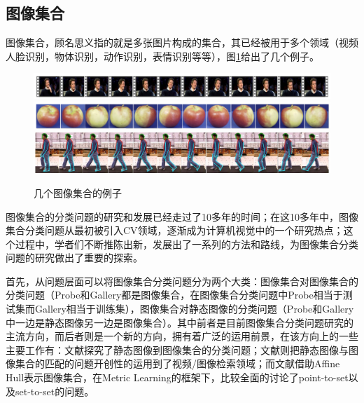 \subsection{图像集合}
\label{sec:Image-Set}
图像集合，顾名思义指的就是多张图片构成的集合，其已经被用于多个领域（视频人脸识别，物体识别，动作识别，表情识别等等），图\ref{fig:image_set_exmples}给出了几个例子。
\begin{figure}[h]
      	{\includegraphics[width=\linewidth]{source/YTC_track.png}}
      	{\includegraphics[width=\linewidth]{source/ETH80_apple.png}}
    	{\includegraphics[width=\linewidth]{source/cmu_MoBo.jpg}}
  	\caption{几个图像集合的例子}
  	\label{fig:image_set_exmples}
\end{figure}

图像集合的分类问题的研究和发展已经走过了10多年的时间；在这10多年中，图像集合分类问题从最初被引入CV领域，逐渐成为计算机视觉中的一个研究热点；这个过程中，学者们不断推陈出新，发展出了一系列的方法和路线，为图像集合分类问题的研究做出了重要的探索。

首先，从问题层面可以将图像集合分类问题分为两个大类：图像集合对图像集合的分类问题（Probe和Gallery都是图像集合，在图像集合分类问题中Probe相当于测试集而Gallery相当于训练集），图像集合对静态图像的分类问题（Probe和Gallery中一边是静态图像另一边是图像集合）。其中前者是目前图像集合分类问题研究的主流方向，而后者则是一个新的方向，拥有着广泛的运用前景，在该方向上的一些主要工作有：文献\cite{Statistics_LERM}探究了静态图像到图像集合的分类问题；文献\cite{Statistics_HER}则把静态图像与图像集合的匹配的问题开创性的运用到了视频/图像检索领域；而文献\cite{Affinehull_P2SML}借助Affine Hull表示图像集合，在Metric Learning的框架下，比较全面的讨论了point-to-set以及set-to-set的问题。

